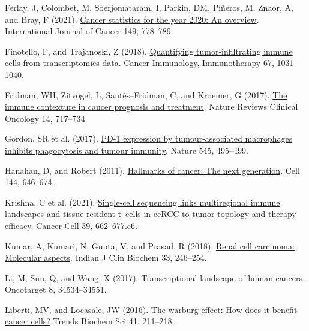 \documentclass[
  parskip,
  oneside]{scrreprt}
\newlength{\cslhangindent}
\newlength{\cslentryspacingunit} %
\newenvironment{CSLReferences}[2] %
 {%
  \setlength{\parindent}{0pt}
  \ifodd #1
  \let\oldpar\par
  \def\par{\hangindent=\cslhangindent\oldpar}
  \fi
  \setlength{\parskip}{#2\cslentryspacingunit}
 }%
 {}
\begin{document}
\begin{CSLReferences}{0}{0}
\leavevmode{}%
Ferlay, J, Colombet, M, Soerjomataram, I, Parkin, DM, Piñeros, M, Znaor,
A, and Bray, F (2021). \href{https://doi.org/10.1002/ijc.33588}{Cancer
statistics for the year 2020: An overview}. International Journal of
Cancer 149, 778--789.

\leavevmode{}%
Finotello, F, and Trajanoski, Z (2018).
\href{https://doi.org/10.1007/s00262-018-2150-z}{Quantifying
tumor-infiltrating immune cells from transcriptomics data}. Cancer
Immunology, Immunotherapy 67, 1031--1040.

\leavevmode{}%
Fridman, WH, Zitvogel, L, Sautès--Fridman, C, and Kroemer, G (2017).
\href{https://doi.org/10.1038/nrclinonc.2017.101}{The immune contexture
in cancer prognosis and treatment}. Nature Reviews Clinical Oncology 14,
717--734.

\leavevmode{}%
Gordon, SR et al. (2017).
\href{https://doi.org/10.1038/nature22396}{PD-1 expression by
tumour-associated macrophages inhibits phagocytosis and tumour
immunity}. Nature 545, 495--499.

\leavevmode{}%
Hanahan, D, and Robert (2011).
\href{https://doi.org/10.1016/j.cell.2011.02.013}{Hallmarks of cancer:
The next generation}. Cell 144, 646--674.

\leavevmode{}%
Krishna, C et al. (2021).
\href{https://doi.org/10.1016/j.ccell.2021.03.007}{Single-cell
sequencing links multiregional immune landscapes and tissue-resident
t~cells in ccRCC to tumor topology and therapy efficacy}. Cancer Cell
39, 662--677.e6.

\leavevmode{}%
Kumar, A, Kumari, N, Gupta, V, and Prasad, R (2018).
\href{https://doi.org/10.1007/s12291-017-0713-y}{Renal cell carcinoma:
Molecular aspects}. Indian J Clin Biochem 33, 246--254.

\leavevmode{}%
Li, M, Sun, Q, and Wang, X (2017).
\href{https://doi.org/10.18632/oncotarget.15837}{Transcriptional
landscape of human cancers}. Oncotarget 8, 34534--34551.

\leavevmode{}%
Liberti, MV, and Locasale, JW (2016).
\href{https://doi.org/10.1016/j.tibs.2015.12.001}{The warburg effect:
How does it benefit cancer cells?} Trends Biochem Sci 41, 211--218.


\end{CSLReferences}
\end{document}

